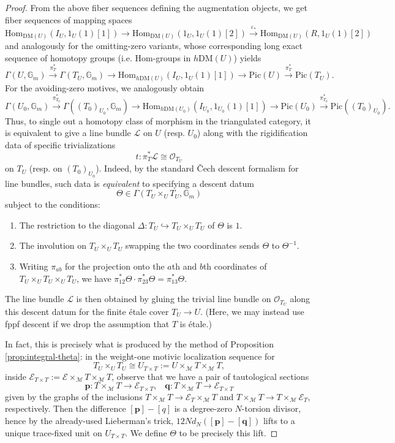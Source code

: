 \documentclass[a4paper,reqno,11pt]{amsart}
\theoremstyle{plain}
\theoremstyle{definition}
\theoremstyle{remark}
\newcommand{\G}{\mathbb{G}}
\newcommand{\DM}{\mathrm{DM}}
\newcommand{\Hom}{\mathrm{Hom}}
\newcommand{\Pic}{\mathrm{Pic}}
\begin{document}
\begin{proof}
    From the above fiber sequences defining the augmentation objects, we get fiber sequences of mapping spaces
\[
\Hom_{\DM(U)}(I_U, 1_U(1)[1]) \to \Hom_{\DM(U)}(1_U, 1_U(1)[2]) \xrightarrow{\varepsilon_*} \Hom_{\DM(U)}(R, 1_U(1)[2])\]
and analogously for the omitting-zero variants, whose corresponding long exact sequence of homotopy groups (i.e. Hom-groups in $h\DM(U)$) yields
\[
   \Gamma(U, \G_m)\xrightarrow{\pi_T^*}  \Gamma(T_U, \G_m)\to \Hom_{h\DM(U)}(I_U, 1_U(1)[1]) \to \Pic(U) \xrightarrow{\pi_T^*} \Pic(T_U).
\]
For the avoiding-zero motives, we analogously obtain 
\[
   \Gamma(U_0, \G_m)\xrightarrow{\pi_{T_0}^*}  \Gamma((T_0)_{U_0}, \G_m)\to \Hom_{h\DM(U_0)}(I_{U_0}, 1_{U_0}(1)[1]) \to \Pic(U_0) \xrightarrow{\pi_{T_0}^*} \Pic((T_0)_{U_0}).
\]
Thus, to single out a homotopy class of morphism in the triangulated category, it is equivalent to give a line bundle $\mathcal{L}$ on $U$ (resp. $U_0$) along with the rigidification data of specific trivializations 
\[
t:\pi_T^*\mathcal{L} \cong \mathcal{O}_{T_U}
\]
on $T_U$ (resp. on $(T_0)_{U_0}$). Indeed, by the standard \v{C}ech descent formalism for line bundles, such data is \emph{equivalent} to specifying a descent datum
\[
    \Theta \in \Gamma(T_U \times_U T_U, \G_m)
\]
subject to the conditions:
\begin{enumerate}
    \item The restriction to the diagonal $\Delta: T_U \hookrightarrow T_U \times_U T_U$ of $\Theta$ is $1$.
    \item The involution on $T_U\times_U T_U$ swapping the two coordinates sends $\Theta$ to $\Theta^{-1}$.
    \item Writing $\pi_{ab}$ for the projection onto the $a$th and $b$th coordinates of $T_U \times_U T_U \times_U T_U$, we have $\pi_{12}^*\Theta \cdot \pi_{23}^*\Theta = \pi_{13}^*\Theta$.
\end{enumerate}
The line bundle $\mathcal{L}$ is then obtained by gluing the trivial line bundle on $\mathcal{O}_{T_U}$ along this descent datum for the finite \'{e}tale cover $T_U\to U$. (Here, we may instead use fppf descent if we drop the assumption that $T$ is \'{e}tale.)

In fact, this is precisely what is produced by the method of Proposition \ref{prop:integral-theta}: in the weight-one motivic localization sequence for 
\[
T_U \times_U T_U \cong U_{T\times T}:= U\times_{\mathcal{M}} T \times_{\mathcal{M}} T,
\]
inside $\mathcal{E}_{T\times T}:= \mathcal{E}\times_{\mathcal{M}} T \times_{\mathcal{M}} T$, observe that we have a pair of tautological sections 
\[
\mathbf p: T \times_{\mathcal{M}} T \to \mathcal{E}_{T\times T},\;\;\; \mathbf q: T \times_{\mathcal{M}} T \to \mathcal{E}_{T\times T}
\]
given by the graphs of the inclusions $T \times_{\mathcal{M}} T \to \mathcal{E}_{T} \times_{\mathcal{M}} T$ and $T \times_{\mathcal{M}} T \to T\times_{\mathcal{M}} \mathcal{E}_{T}$, respectively. Then the difference $[\mathbf p]-[q]$ is a degree-zero $N$-torsion divisor, hence by the already-used Lieberman's trick, $12Nd_N ([\mathbf p]-[\mathbf q])$ lifts to a unique trace-fixed unit on $U_{T\times T}$. We define $\Theta$ to be precisely this lift.


\end{proof}
\end{document}
